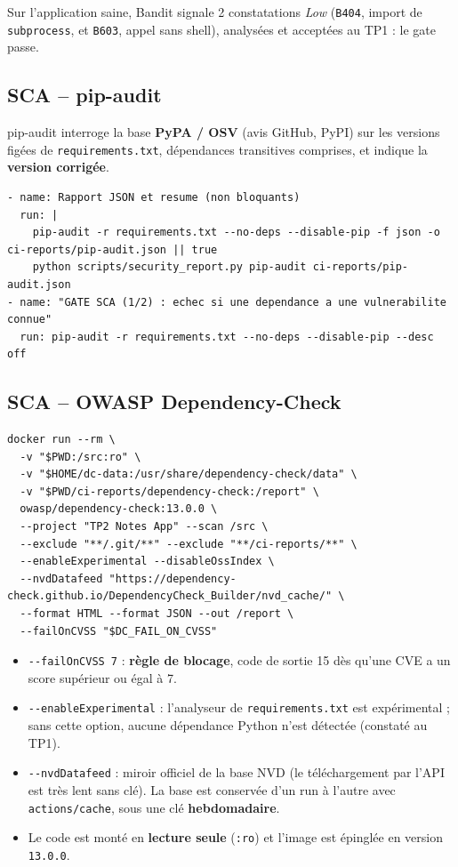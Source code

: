 \documentclass[11pt,a4paper]{article}
\newcommand{\code}[1]{\texttt{#1}}
\begin{document}
Sur l'application saine, Bandit signale 2 constatations \emph{Low} (\code{B404}, import de
\code{subprocess}, et \code{B603}, appel sans shell), analysées et acceptées au TP1 : le gate passe.

\subsection{SCA -- pip-audit}
pip-audit interroge la base \textbf{PyPA / OSV} (avis GitHub, PyPI) sur les versions figées de
\code{requirements.txt}, dépendances transitives comprises, et indique la \textbf{version corrigée}.

\begin{lstlisting}[caption={Étapes pip-audit du pipeline}]
- name: Rapport JSON et resume (non bloquants)
  run: |
    pip-audit -r requirements.txt --no-deps --disable-pip -f json -o ci-reports/pip-audit.json || true
    python scripts/security_report.py pip-audit ci-reports/pip-audit.json
- name: "GATE SCA (1/2) : echec si une dependance a une vulnerabilite connue"
  run: pip-audit -r requirements.txt --no-deps --disable-pip --desc off
\end{lstlisting}

\subsection{SCA -- OWASP Dependency-Check}
\begin{lstlisting}[caption={Lancement d'OWASP Dependency-Check dans le pipeline}]
docker run --rm \
  -v "$PWD:/src:ro" \
  -v "$HOME/dc-data:/usr/share/dependency-check/data" \
  -v "$PWD/ci-reports/dependency-check:/report" \
  owasp/dependency-check:13.0.0 \
  --project "TP2 Notes App" --scan /src \
  --exclude "**/.git/**" --exclude "**/ci-reports/**" \
  --enableExperimental --disableOssIndex \
  --nvdDatafeed "https://dependency-check.github.io/DependencyCheck_Builder/nvd_cache/" \
  --format HTML --format JSON --out /report \
  --failOnCVSS "$DC_FAIL_ON_CVSS"
\end{lstlisting}

\begin{itemize}
  \item \code{-{}-failOnCVSS 7} : \textbf{règle de blocage}, code de sortie 15 dès qu'une CVE a un
        score supérieur ou égal à 7.
  \item \code{-{}-enableExperimental} : l'analyseur de \code{requirements.txt} est expérimental ; sans
        cette option, aucune dépendance Python n'est détectée (constaté au TP1).
  \item \code{-{}-nvdDatafeed} : miroir officiel de la base NVD (le téléchargement par l'API est très
        lent sans clé). La base est conservée d'un run à l'autre avec \code{actions/cache}, sous une
        clé \textbf{hebdomadaire}.
  \item Le code est monté en \textbf{lecture seule} (\code{:ro}) et l'image est épinglée en version
        \code{13.0.0}.
\end{itemize}
\end{document}
